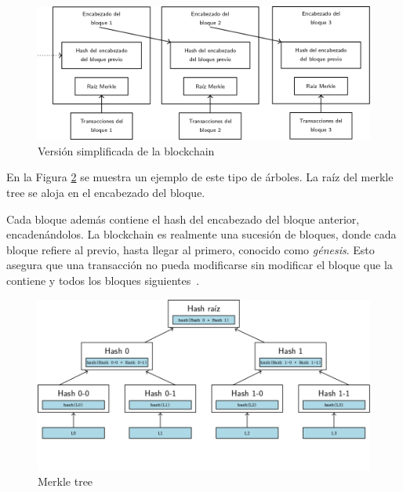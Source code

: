 \begin{figure}[h]
  \centering
  \includegraphics[scale=0.4]{figures/blockchain.png}
  \caption{Versión simplificada de la blockchain}
  \label{fig:blockchain}
\end{figure}


En la Figura \ref{fig:merkle-tree} se muestra un ejemplo de este tipo de árboles.
La raíz del merkle tree se aloja en el encabezado del bloque.

%
Cada bloque además contiene el hash del encabezado del bloque anterior, encadenándolos.
La blockchain es realmente una sucesión de bloques, donde cada bloque refiere al previo,
hasta llegar al primero, conocido como \textit{génesis}.
Esto asegura que una transacción no pueda modificarse sin modificar el bloque
que la contiene y todos los bloques siguientes~\cite{bitcoin}.

\begin{figure}[h]
  \centering
  \includegraphics[scale=0.4]{figures/merkle-tree.png}
  \caption{Merkle tree}
  \label{fig:merkle-tree}
\end{figure}


